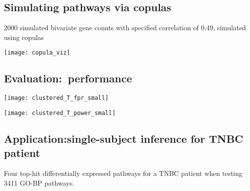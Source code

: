 \documentclass[a0,portrait]{a0poster}
\begin{document}
\begin{multicols}{3}

\subsection*{Simulating pathways via copulas}
2000 simulated bivariate gene counts with specified correlation of 0.49, simulated using copulas\cite{Genest2007,Yan2007}
\begin{center}\vspace{1cm}
\texttt{[image: copula\_viz]}
\end{center}\vspace{1cm}


\subsection{Evaluation:~performance}
\begin{center}\vspace{1cm}
\texttt{[image: clustered\_T\_fpr\_small]}
\end{center}\vspace{1cm}

\begin{center}\vspace{1cm}
\texttt{[image: clustered\_T\_power\_small]}
\end{center}\vspace{1cm}

\subsection{Application:single-subject inference for TNBC patient}
Four top-hit differentially expressed pathways for a TNBC patient when testing 3411 GO-BP pathways.


\end{multicols}
\end{document}
